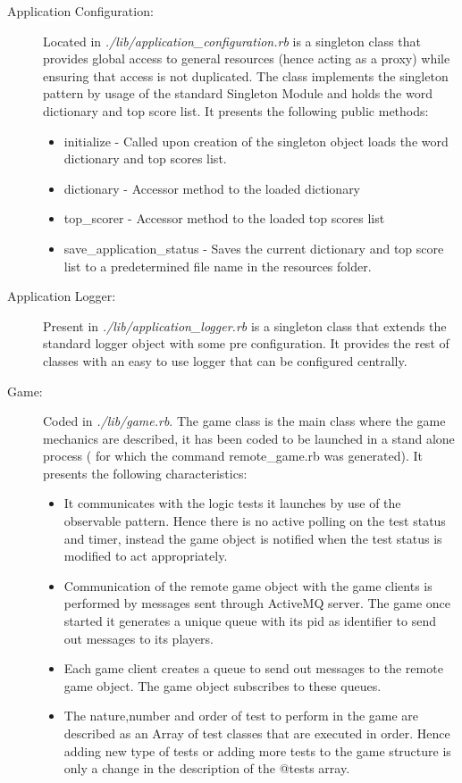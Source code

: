 \documentclass[a4paper,10pt,titlepage]{article}
\begin{document}
\begin{description}
	\item[Application Configuration:] Located in \textit{./lib/application\_configuration.rb} is a singleton class that provides global access to general resources (hence acting as a proxy) while ensuring that access is not duplicated. The class implements the singleton pattern by usage of the standard Singleton Module and holds the word dictionary and top score list. It presents the following public methods:
	\begin{itemize}
		\item initialize - Called upon creation of the singleton object loads the word dictionary and top scores list.
		\item dictionary - Accessor method to the loaded dictionary
		\item top\_scorer - Accessor method to the loaded top scores list
		\item save\_application\_status - Saves the current dictionary and top score list to a predetermined file name in the resources folder. 
	\end{itemize}
	\item[Application Logger:] Present in \textit{./lib/application\_logger.rb} is a singleton class that extends the standard logger object with some pre configuration. It provides the rest of classes with an easy to use logger that can be configured centrally. 
	\item[Game:] Coded in \textit{./lib/game.rb}. The game class is the main class where the game mechanics are described, it has been coded to be launched in a stand alone process ( for which the command remote\_game.rb was generated). It presents the following characteristics:
	\begin{itemize}
		\item It communicates with the logic tests it launches by use of the observable pattern. Hence there is no active polling on the test status and timer, instead the game object is notified when the test status is modified to act appropriately.
		\item Communication of the remote game object with the game clients is performed by messages sent through ActiveMQ server. The game once started it generates a unique queue with its pid as identifier to send out messages to its players.
		\item Each game client creates a queue to send out messages to the remote game object. The game object subscribes to these queues.
		\item The nature,number and order of test to perform in the game are described as an Array of test classes that are executed in order. Hence adding new type of tests or adding more tests to the game structure is only a change in the description of the @tests array. 

\end{itemize}
\end{description}
\end{document}
